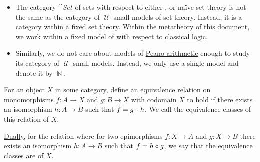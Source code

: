 \begin{example}
\begin{itemize}
    \item The category \hyperref[def:category_of_small_sets]{\( \cat{Set} \)} of sets with respect to either ,  or na\"ive set theory is not the same as the category of \( \mscrU \)-small models of set theory. Instead, it is a category within a fixed set theory. Within the metatheory of this document, we work within a fixed model of  with respect to \hyperref[rem:classical_logic]{classical logic}.

    \item Similarly, we do not care about models of \hyperref[def:peano_arithmetic]{Peano arithmetic} enough to study its category of \( \mscrU \)-small models. Instead, we only use a single model and denote it by \( \BbbN \).
  \end{itemize}
\end{example}

\begin{definition}\label{def:subobject_and_quotient}
  For an object \( X \) in some \hyperref[def:category]{category}, define an equivalence relation on \hyperref[def:morphism_invertibility/left_cancellative]{monomorphisms} \( f: A \to X \) and \( g: B \to X \) with codomain \( X \) to hold if there exists an isomorphism \( h: A \to B \) such that \( f = g \bincirc h \). We call the equivalence classes of this relation  of \( X \).

  \hyperref[thm:categorical_principle_of_duality]{Dually}, for the relation where for two epimorphisms \( f: X \to A \) and \( g: X \to B \) there exists an isomorphism \( h: A \to B \) such that \( f = h \bincirc g \), we say that the equivalence classes are  of \( X \).
\end{definition}

